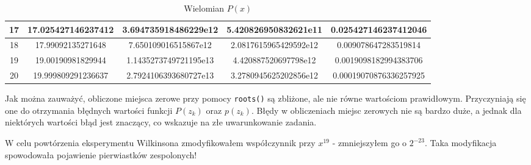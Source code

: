 \documentclass[15pt, a4paper]{article}
\begin{document}
\begin{table}[h]
\begin{adjustbox}{max width=\textwidth}
\begin{tabular}{|c|c|c|c|c|}
        17 & 17.025427146237412 & 3.694735918486229e12 & 5.420826950832621e11 & 0.025427146237412046 \\ \hline
        18 & 17.99092135271648 & 7.650109016515867e12 & 2.0817615965429592e12 & 0.009078647283519814 \\ \hline
        19 & 19.00190981829944 & 1.1435273749721195e13 & 4.420887520697798e12 & 0.0019098182994383706 \\ \hline
        20 & 19.999809291236637 & 2.7924106393680727e13 & 3.2780945625202856e12 & 0.00019070876336257925 \\ \hline
    \end{tabular}
    \end{adjustbox}
    \caption{Wielomian \(P(x)\)}
    \label{wielomian}
\end{table}

\vspace{0.5cm}

\noindent Jak można zauważyć, obliczone miejsca zerowe przy pomocy \verb|roots()| są zbliżone, ale nie równe wartościom prawidłowym. Przyczyniają się one do otrzymania błędnych wartości funkcji \(P(z_k)\) oraz \(p(z_k)\). Błędy w obliczeniach miejsc zerowych nie są bardzo duże, a jednak dla niektórych wartości błąd jest znaczący, co wskazuje na złe uwarunkowanie zadania.

\vspace{0.5cm}

\noindent W celu powtórzenia eksperymentu Wilkinsona zmodyfikowałem współczynnik przy \(x^{19}\) - zmniejszyłem go o \(2^{-23}\). Taka modyfikacja spowodowała pojawienie pierwiastków zespolonych!

\vspace{0.5cm}
\end{document}
